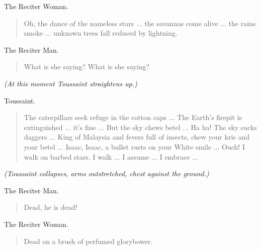 \documentclass[letterpaper,article,12pt,oneside,notitlepage]{memoir}
\begin{document}
\begin{center}The Reciter Woman.\end{center}

\begin{verse}
\indent Oh, the dance of the nameless stars ... the savannas come alive ... the rains smoke ... unknown trees fall reduced by lightning.  \\
\end{verse}

\begin{center}The Reciter Man.\end{center}

\begin{verse}
\indent What is she saying? What is she saying?  \\
\end{verse}

\textit{(At this moment Toussaint straightens up.)}

\begin{center}Toussaint.\end{center}

\begin{verse}
 \indent The caterpillars seek refuge in the cotton caps ... The Earth's firepit is extinguished ... it's fine ... But the sky chews betel ... Ha ha! The sky sucks daggers ... King of Malaysia and fevers full of insects, chew your kris and your betel ... Isaac, Isaac, a bullet rusts on your White smile ... Ouch! I walk on barbed stars. I walk ... I assume ... I embrace ...  \\
\end{verse}

\textit{(Toussaint collapses, arms outstretched, chest against the ground.)}

\begin{center}The Reciter Man.\end{center}

\begin{verse}
\hspace{1cm} Dead, he is dead! \\
\end{verse}

\begin{center}The Reciter Woman.\end{center}

\begin{verse}
\hspace{1cm} Dead on a brush of perfumed glorybower. \\
\end{verse}
\end{document}
